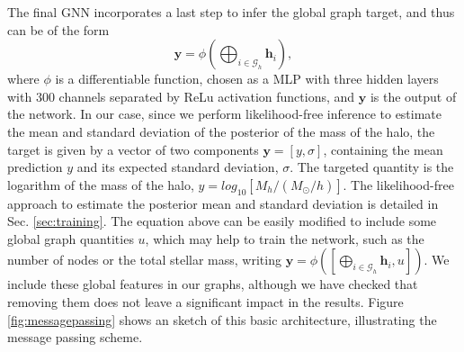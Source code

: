 \documentclass[twocolumn]{aastex631}
\begin{document}
The final GNN incorporates a last step to infer the global graph target, and thus can be of the form
\begin{equation}
\textbf{y} = \phi\left( \bigoplus_{i \in \mathcal{G}_h} \textbf{h}_i \right),
 \label{eq:gnn}
\end{equation}
where $\phi$ is a differentiable function, chosen as a MLP with three hidden layers with 300 channels separated by ReLu activation functions, and $\textbf{y}$ is the output of the network. In our case, since we perform likelihood-free inference to estimate the mean and standard deviation of the posterior of the mass of the halo, the target is given by a vector of two components $\textbf{y}=[ y,\sigma ]$, containing the mean prediction $y$ and its expected standard deviation, $\sigma$. The targeted quantity is the logarithm of the mass of the halo, $y=log_{10}\left[M_h/(M_\odot/h)\right]$. The likelihood-free approach to estimate the posterior mean and standard deviation is detailed in Sec. \ref{sec:training}. The equation above can be easily modified to include some global graph quantities $u$, which may help to train the network, such as the number of nodes or the total stellar mass, writing $\textbf{y} = \phi\left( [\bigoplus_{i \in \mathcal{G}_h} \textbf{h}_i, u] \right)$. We include these global features in our graphs, although we have checked that removing them does not leave a significant impact in the results. Figure \ref{fig:messagepassing} shows an sketch of this basic architecture, illustrating the message passing scheme.
\end{document}
